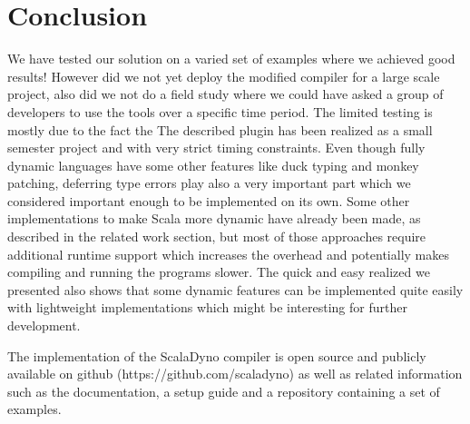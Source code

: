 \section{Conclusion}
We have tested our solution on a varied set of examples where we achieved good results! However did we not yet deploy the modified compiler for a large scale project, also did we not do a field study where we could have asked a group of developers to use the tools over a specific time period. The limited testing is mostly due to the fact the The described plugin has been realized as a small semester project and with very strict timing constraints.
Even though fully dynamic languages have some other features like duck typing and monkey patching, deferring type errors play also a very important part which we considered important enough to be implemented on its own. Some other implementations to make Scala more dynamic have already been made, as described in the related work section, but most of those approaches require additional runtime support which increases the overhead and potentially makes compiling and running the programs slower. The quick and easy realized we presented also shows that some dynamic features can be implemented quite easily with lightweight implementations which might be interesting for further development.

The implementation of the ScalaDyno compiler is open source and publicly available on github (https://github.com/scaladyno) as well as related information such as the documentation, a setup guide and a repository containing a set of examples.